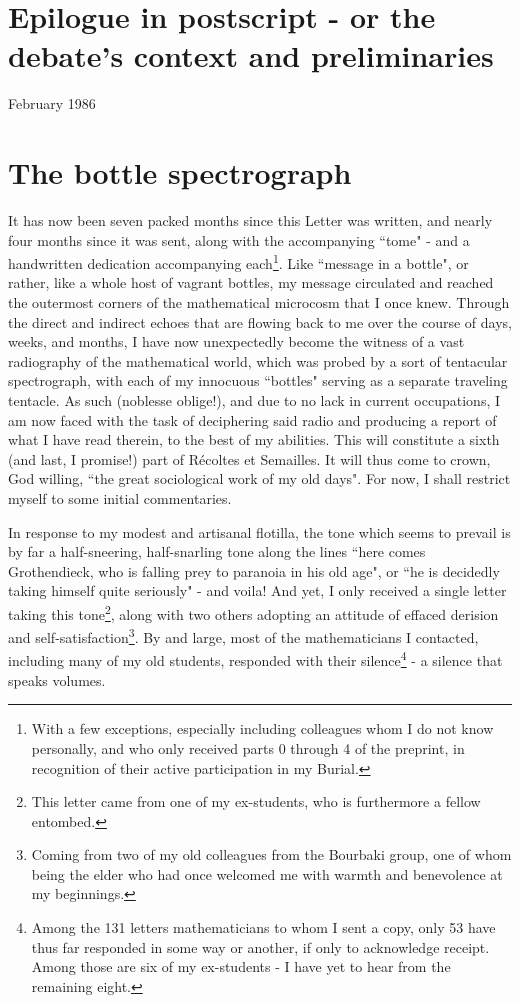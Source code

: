 \section*{Epilogue in postscript - or the debate's context and preliminaries}

\begin{flushright}
February 1986
\end{flushright} 

\section{The bottle spectrograph}

It has now been seven packed months since this Letter was written, and nearly four months since it was sent, along with the accompanying ``tome" - and a handwritten dedication accompanying each\footnote{With a few exceptions, especially including colleagues whom I do not know personally, and who only received parts 0 through 4 of the preprint, in recognition of their active participation in my Burial.}. Like ``message in a bottle", or rather, like a whole host of vagrant bottles, my message circulated and reached the outermost corners of the mathematical microcosm that I once knew. Through the direct and indirect echoes that are flowing back to me over the course of days, weeks, and months, I have now unexpectedly become the witness of a vast radiography of the mathematical world, which was probed by a sort of tentacular spectrograph, with each of my innocuous ``bottles" serving as a separate traveling tentacle. As such (noblesse oblige!), and due to no lack in current occupations, I am now faced with the task of deciphering said radio and producing a report of what I have read therein, to the best of my abilities. This will constitute a sixth (and last, I promise!) part of R\'ecoltes et Semailles. It will thus come to crown, God willing, ``the great sociological work of my old days". For now, I shall restrict myself to some initial commentaries.

In response to my modest and artisanal flotilla, the tone which seems to prevail is by far a half-sneering, half-snarling tone along the lines ``here comes Grothendieck, who is falling prey to paranoia in his old age", or ``he is decidedly taking himself quite seriously" - and voila! And yet, I only received a single letter taking this tone\footnote{This letter came from one of my ex-students, who is furthermore a fellow entombed.}, along with two others adopting an attitude of effaced derision and self-satisfaction\footnote{Coming from two of my old colleagues from the Bourbaki group, one of whom being the elder who had once welcomed me with warmth and benevolence at my beginnings.}. By and large, most of the mathematicians I contacted, including many of my old students, responded with their silence\footnote{Among the 131 letters mathematicians to whom I sent a copy, only 53 have thus far responded in some way or another, if only to acknowledge receipt. Among those are six of my ex-students - I have yet to hear from the remaining eight.} - a silence that speaks volumes.

